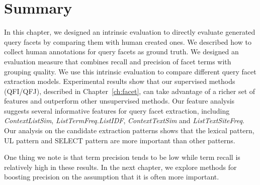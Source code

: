 
\section{Summary} \label{sec:ie-conclusions}
In this chapter, we designed an intrinsic evaluation to directly evaluate generated query facets by comparing them with human created ones. We described how to collect human annotations for query facets as ground truth. We designed an evaluation measure that combines recall and precision of facet terms with grouping quality. We use this intrinsic evaluation to compare different query facet extraction models. Experimental results show that our supervised methods (QFI/QFJ), described in Chapter~\ref{ch:facet}, can take advantage of a richer set of features and outperform other unsupervised methods. Our feature analysis suggests several informative features for query facet extraction, including \textit{ContextListSim}, \textit{ListTermFreq.ListIDF}, \textit{ContextTextSim} and \textit{ListTextSiteFreq}. Our analysis on the candidate extraction patterns shows that the lexical pattern, UL pattern and SELECT pattern are more important than other patterns.


One thing we note is that term precision tends to be low while term recall is relatively high in these results. In the next chapter, we explore methods for boosting precision on the assumption that it is often more important.

